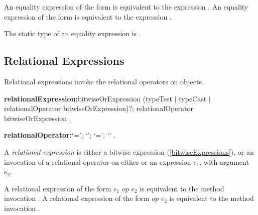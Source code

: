 \documentclass{article}
\begin{document}

\LMHash{}
An equality expression of the form  is equivalent to the expression .
An equality expression of the form  is equivalent to the expression .


\LMHash{}
The static type of an equality expression is .


\subsection{Relational Expressions}

\LMHash{}
Relational expressions invoke the relational operators on objects.

\begin{grammar}
{\bf relationalExpression:}bitwiseOrExpression (typeTest $|$ typeCast $|$
  \gnewline{} relationalOperator bitwiseOrExpression)?;
  \SUPER{} relationalOperator bitwiseOrExpression
  .

{\bf relationalOperator:}`{\escapegrammar \gt=}';
  `{\escapegrammar \gt}';
  `{\escapegrammar \lt}=';
  `{\escapegrammar \lt}'
  .
\end{grammar}

\LMHash{}
A {\em relational expression} is either a bitwise expression (\ref{bitwiseExpressions}), or an invocation of a relational operator on either \SUPER{} or an expression $e_1$, with argument $e_2$.

\LMHash{}
A relational expression of the form $e_1$ $op$ $e_2$ is equivalent to the method invocation .
A relational expression of the form \SUPER{} $op$ $e_2$ is equivalent to the method invocation .
\end{document}
